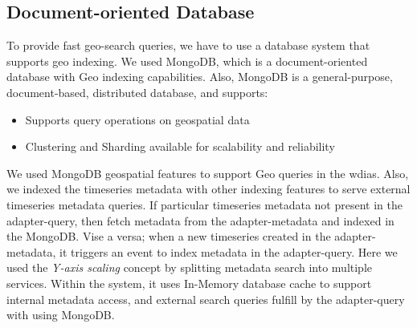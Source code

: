 \subsection{Document-oriented Database}
\label{subse:mongodb}

To provide fast geo-search queries, we have to use a database system that supports geo indexing. We used MongoDB, which is a document-oriented database with Geo indexing capabilities. Also, MongoDB \cite{mongodbMongoDBManual} is a general-purpose, document-based, distributed database, and supports: 

\begin{itemize}
  \item Supports query operations on geospatial data \cite{mongodbMongoDBManual}
  \item Clustering and Sharding available for scalability and reliability
\end{itemize}

We used MongoDB geospatial features to support Geo queries in the \acrshort{wdias}. Also, we indexed the timeseries metadata with other indexing features to serve external timeseries metadata queries. If particular timeseries metadata not present in the adapter-query, then fetch metadata from the adapter-metadata and indexed in the MongoDB. Vise a versa; when a new timeseries created in the adapter-metadata, it triggers an event to index metadata in the adapter-query.
Here we used the \emph{Y-axis scaling} concept by splitting metadata search into multiple services. Within the system, it uses In-Memory database cache to support internal metadata access, and external search queries fulfill by the adapter-query with using MongoDB.

